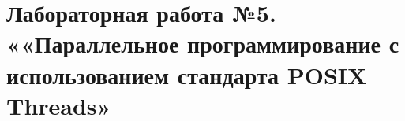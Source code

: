{ %
	\section{Лабораторная работа №5. ««Параллельное программирование с использованием стандарта POSIX Threads»}
	
	
	
}
